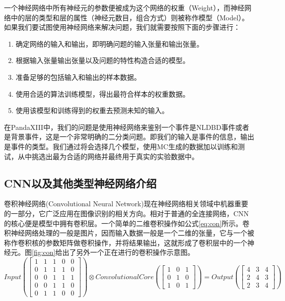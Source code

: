 一个神经网络中所有神经元的参数便被成为这个网络的权重（Weight），而神经网络中的层的类型和层的属性（神经元数目，组合方式）则被称作模型（Model）。如果我们要试图使用神经网络来解决问题，我们就需要按照下面的步骤进行：
\begin{enumerate}
    \item 确定网络的输入和输出，即明确问题的输入张量和输出张量。
    \item 根据输入张量输出张量以及问题的特性构造合适的模型。
    \item 准备足够的包括输入和输出的样本数据。
    \item 使用合适的算法训练模型，得出最符合样本的权重数据。
    \item 使用该模型和训练得到的权重去预测未知的输入。
\end{enumerate}
在PandaXIII中，我们的问题是使用神经网络来鉴别一个事件是NLDBD事件或者是背景事件，这是一个非常明确的二分类问题。即我们的输入是事件的信息，输出是事件的类型。我们通过将会选择几个模型，使用MC生成的数据加以训练和测试，从中挑选出最为合适的网络并最终用于真实的实验数据中。

\subsection{CNN以及其他类型神经网络介绍}

卷积神经网络(Convolutional Neural Network)现在神经网络相关领域中机器重要的一部分，它广泛应用在图像识别的相关方向。相对于普通的全连接网络，CNN的核心便是模型中拥有卷积层。一个简单的二维卷积操作如公式\ref{eq:con}所示。卷积神经网络处理的一般是图片，因而输入数据一般是一个二维的张量，它与一个被称作卷积核的参数矩阵做卷积操作，并将结果输出，这就形成了卷积层中的一个神经元。图\ref{fig:con}给出了另外一个正在进行的卷积操作示意图。
\renewcommand\arraystretch{1.0}
\begin{equation}
    Input(\left[ \begin{array}{ccccc}
        1&1&1&0&0\\
        0&1&1&1&0\\
        0&0&1&1&1\\
        0&0&1&1&0\\
        0&1&1&0&0
    \end{array} \right])
    \otimes Convolutional Core(\left[ \begin{array}{ccc}
        1&0&1\\
        0&1&0\\
        1&0&1
    \end{array} \right]) = Output(\left[ \begin{array}{ccc}
        4 &3 &4\\
        2 &4&3\\
        2&3&4
    \end{array} \right])
    \label{eq:con}
\end{equation}

